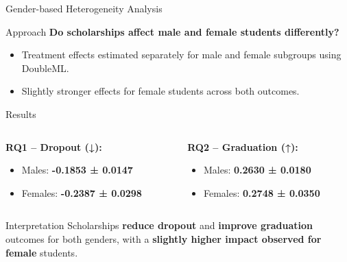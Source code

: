 \documentclass[aspectratio=169]{beamer}
\begin{document}
\begin{frame}{Gender-based Heterogeneity Analysis}
\vspace{5pt}
\begin{alertblock}{Approach}
	\textbf{Do scholarships affect male and female students differently?}
	\vspace{-10pt}
	\begin{itemize}[label=--,itemsep=1pt]
    \item Treatment effects estimated separately for male and female subgroups using DoubleML.
    \item Slightly stronger effects for female students across both outcomes.
\end{itemize}
\end{alertblock}
\vspace{5pt}
\begin{block}{Results}
\vspace{8pt}
\begin{columns}
\begin{column}{0.45\textwidth}
\textbf{RQ1 – Dropout (↓):}
\vspace{-3pt}
\begin{itemize}[label=--,itemsep=1pt]
    \item Males: \textbf{-0.1853 ± 0.0147}
    \item Females: \textbf{-0.2387 ± 0.0298}
\end{itemize}
\end{column}

\begin{column}{0.45\textwidth}
\textbf{RQ2 – Graduation (↑):}
\vspace{-3pt}
\begin{itemize}[label=--,itemsep=1pt]
    \item Males: \textbf{0.2630 ± 0.0180}
    \item Females: \textbf{0.2748 ± 0.0350}
\end{itemize}
\end{column}
\end{columns}
\vspace{4pt}
\end{block}



\vspace{5pt}
\begin{exampleblock}{Interpretation}
Scholarships \textbf{reduce dropout} and \textbf{improve graduation} outcomes for both genders, with a \textbf{slightly higher impact observed for female} students.

\end{exampleblock}

\end{frame}
\end{document}
